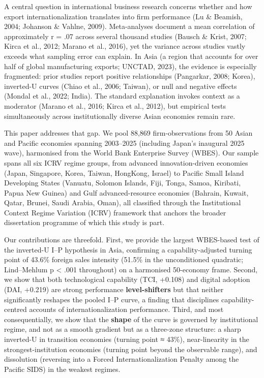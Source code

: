 \documentclass[
  12pt,a4paper]{article}
\begin{document}
A central question in international business research concerns whether
and how export internationalization translates into firm performance (Lu
\& Beamish, 2004; Johanson \& Vahlne, 2009). Meta-analyses document a
mean correlation of approximately r = .07 across several thousand
studies (Bausch \& Krist, 2007; Kirca et al., 2012; Marano et al.,
2016), yet the variance across studies vastly exceeds what sampling
error can explain. In Asia (a region that accounts for over half of
global manufacturing exports; UNCTAD, 2023), the evidence is especially
fragmented: prior studies report positive relationships (Pangarkar,
2008; Korea), inverted-U curves (Chiao et al., 2006; Taiwan), or null
and negative effects (Mondal et al., 2022; India). The standard
explanation invokes context as a moderator (Marano et al., 2016; Kirca
et al., 2012), but empirical tests simultaneously across institutionally
diverse Asian economies remain rare.

This paper addresses that gap. We pool 88,869 firm-observations from 50
Asian and Pacific economies spanning 2003--2025 (including Japan's
inaugural 2025 wave), harmonised from the World Bank Enterprise Survey
(WBES). Our sample spans all six ICRV regime groups, from advanced
innovation-driven economies (Japan, Singapore, Korea, Taiwan, HongKong,
Israel) to Pacific Small Island Developing States (Vanuatu, Solomon
Islands, Fiji, Tonga, Samoa, Kiribati, Papua New Guinea) and Gulf
advanced-resource economies (Bahrain, Kuwait, Qatar, Brunei, Saudi
Arabia, Oman), all classified through the Institutional Context Regime
Variation (ICRV) framework that anchors the broader dissertation
programme of which this study is part.

Our contributions are threefold. First, we provide the largest
WBES-based test of the inverted-U I--P hypothesis in Asia, confirming a
capability-adjusted turning point of 43.6\% foreign sales intensity
(51.5\% in the unconditioned quadratic; Lind--Mehlum p \textless{} .001
throughout) on a harmonised 50-economy frame. Second, we show that both
technological capability (TCI, +0.108) and digital adoption (DAI,
+0.219) are strong performance \textbf{level-shifters} but that neither
significantly reshapes the pooled I--P curve, a finding that disciplines
capability-centred accounts of internationalization performance. Third,
and most consequentially, we show that the \textbf{shape} of the curve
is governed by institutional regime, and not as a smooth gradient but as
a three-zone structure: a sharp inverted-U in transition economies
(turning point ≈ 43\%), near-linearity in the strongest-institution
economies (turning point beyond the observable range), and dissolution
(reversing into a Forced Internationalization Penalty among the Pacific
SIDS) in the weakest regimes.
\end{document}
